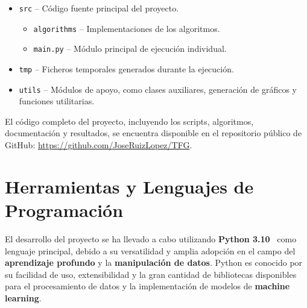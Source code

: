 \begin{itemize}
      \item \texttt{src} -- Código fuente principal del proyecto.
            \begin{itemize}
                  \item \texttt{algorithms} -- Implementaciones de los algoritmos.
                  \item \texttt{main.py} -- Módulo principal de ejecución individual.
            \end{itemize}
      \item \texttt{tmp} -- Ficheros temporales generados durante la ejecución.
      \item \texttt{utils} -- Módulos de apoyo, como clases auxiliares, generación de gráficos y funciones utilitarias.
\end{itemize}

El código completo del proyecto, incluyendo los scripts, algoritmos, documentación y resultados,
se encuentra disponible en el repositorio público de GitHub: \url{https://github.com/JoseRuizLopez/TFG}.


\section{Herramientas y Lenguajes de Programación}\label{sec:herramientas-y-lenguajes-de-programacion}
El desarrollo del proyecto se ha llevado a cabo utilizando \textbf{Python 3.10}~\cite{vanderplasPythonDataScience2016} como
lenguaje principal, debido a su versatilidad y amplia adopción en el campo del \textbf{aprendizaje profundo} y la
\textbf{manipulación de datos}.
Python es conocido por su facilidad de uso, extensibilidad y la gran cantidad de bibliotecas disponibles para el
procesamiento de datos y la implementación de modelos de \textbf{machine learning}.


